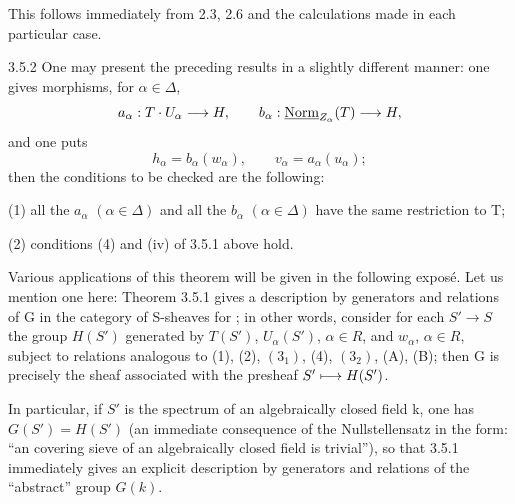 This follows immediately from 2.3, 2.6 and the calculations made in each particular case.
\begin{remark}{3.5.2}\label{XXIII.3.5.2}
One may present the preceding results in a slightly different manner: one gives morphisms, for $\alpha\in\Delta$,
\[
a_\alpha:T\cdot U_\alpha\longrightarrow H,\qquad b_\alpha:\underline{\mathrm{Norm}}_{Z_\alpha}(T)\longrightarrow H,
\]
and one puts
\[
h_\alpha=b_\alpha(w_\alpha),\qquad v_\alpha=a_\alpha(u_\alpha);
\]
then the conditions to be checked are the following:

(1) all the $a_\alpha$ $(\alpha\in\Delta)$ and all the $b_\alpha$ $(\alpha\in\Delta)$ have the same restriction to T;

(2) conditions (4) and (iv) of 3.5.1 above hold.
\end{remark}
Various applications of this theorem will be given in the following exposé. Let us mention one here: Theorem 3.5.1 gives a description by generators and relations of G in the category of S-sheaves for \fppf; in other words, consider for each $S'\to S$ the group $H(S')$ generated by $T(S')$, $U_\alpha(S')$, $\alpha\in R$, and $w_\alpha$, $\alpha\in R$, subject to relations analogous to (1), (2), $(3_1)$, (4), $(3_2)$, (A), (B); then G is precisely the sheaf associated with the presheaf $S'\longmapsto H(S')$.

In particular, if $S'$ is the spectrum of an algebraically closed field k, one has $G(S')=H(S')$ (an immediate consequence of the Nullstellensatz in the form: ``an \fppf covering sieve of an algebraically closed field is trivial''), so that 3.5.1 immediately gives an explicit description by generators and relations of the ``abstract'' group $G(k)$.
